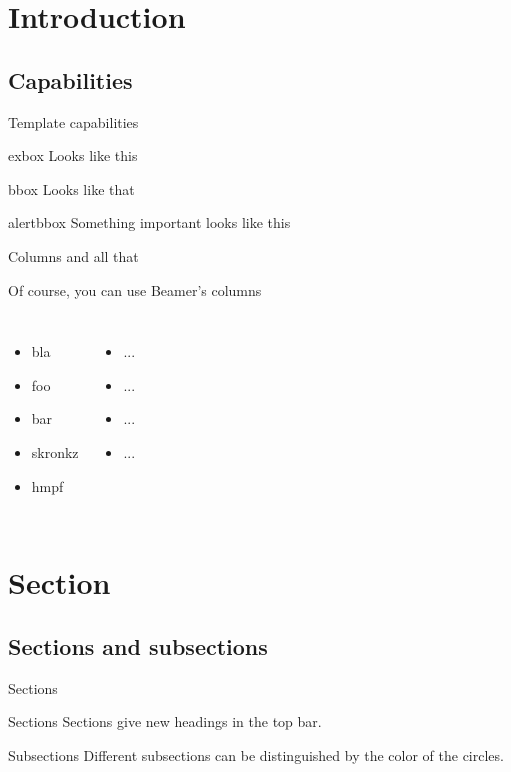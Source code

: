 \section{Introduction}

\subsection{Capabilities}

\begin{frame}{Template capabilities}

\begin{exbox}{exbox}
	Looks like this
\end{exbox}

\begin{bbox}{bbox}
	Looks like that
\end{bbox}

\begin{alertbbox}{alertbbox}
	Something important looks like this
\end{alertbbox}

\end{frame}

\begin{frame}{Columns and all that}

Of course, you can use Beamer's columns

\begin{columns}[t]


\begin{itemize}
	\item bla
	\item foo
	\item bar
	\item skronkz
	\item hmpf
\end{itemize}


\begin{itemize}
	\item ...
	\item ...
	\item ...
	\item ...
\end{itemize}

\end{columns}

\end{frame}

\section{Section}

\subsection{Sections and subsections}

\begin{frame}{Sections}

\begin{exbox}{Sections}
Sections give new headings in the top bar.
\end{exbox}

\begin{exbox}{Subsections}
Different subsections can be distinguished by the color of the circles.
\end{exbox}

\end{frame}

